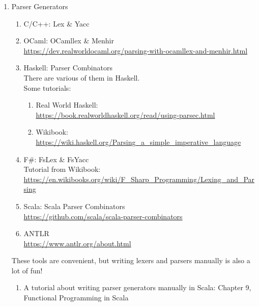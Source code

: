 \documentclass{article}
\begin{document}
\begin{enumerate}
    \item Parser Generators
    \begin{enumerate}
        \item C/C++: Lex \& Yacc \cite{levine1992lex}
        \item OCaml: OCamllex \& Menhir\\
        \href{https://dev.realworldocaml.org/parsing-with-ocamllex-and-menhir.html}{https://dev.realworldocaml.org/parsing-with-ocamllex-and-menhir.html}
        \item Haskell: Parser Combinators\\
        There are various of them in Haskell.\\
        Some tutorials:
        \begin{enumerate}
            \item Real World Haskell: \\
            \href{https://book.realworldhaskell.org/read/using-parsec.html}{https://book.realworldhaskell.org/read/using-parsec.html}
            \item Wikibook: \\
            \href{https://wiki.haskell.org/Parsing_a_simple_imperative_language}{https://wiki.haskell.org/Parsing\_a\_simple\_imperative\_language}
        \end{enumerate}
        \item F\#: FsLex \& FsYacc\\
        Tutorial from Wikibook:\\
        \href{https://en.wikibooks.org/wiki/F_Sharp_Programming/Lexing_and_Parsing}{https://en.wikibooks.org/wiki/F\_Sharp\_Programming/Lexing\_and\_Parsing}
        \item Scala: Scala Parser Combinators\\
        \href{https://github.com/scala/scala-parser-combinators}{https://github.com/scala/scala-parser-combinators}
        \item ANTLR\\
        \href{https://www.antlr.org/about.html}{https://www.antlr.org/about.html}
    \end{enumerate}
    These tools are convenient, but writing lexers and parsers manually is also a lot of fun!
    \begin{enumerate}
        \item A tutorial about writing parser generators manually in Scala:
        Chapter 9, Functional Programming in Scala
        \cite{chiusano2014functional}
    \end{enumerate}


\end{enumerate}
\end{document}
